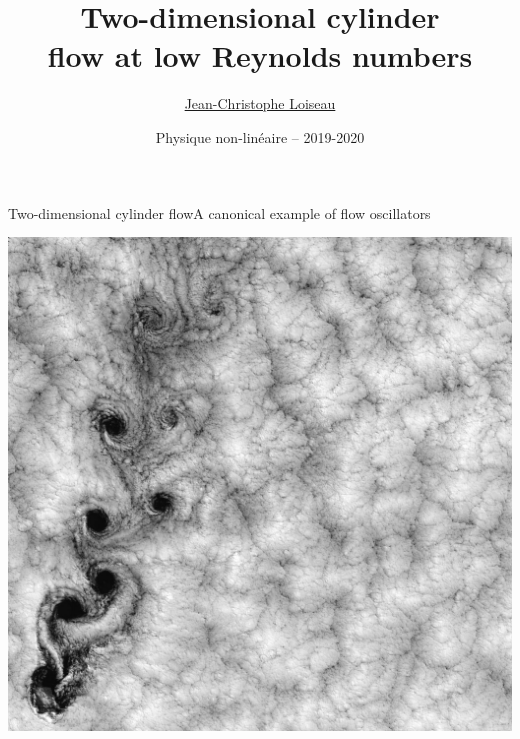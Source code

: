 \documentclass[usenames,dvipsnames,svgnames,10pt,aspectratio=169]{beamer}
\title[Nonlinear physics] %
{
  Two-dimensional cylinder \\
  flow at low Reynolds numbers
}
\author[J.-Ch.~Loiseau] %
{
	\underline{Jean-Christophe Loiseau}
}
\institute[unused]
{
	\url{jean-christophe.loiseau@ensam.eu} \\
	Laboratoire DynFluid \\
	Arts et M\'etiers, France.
}
\date[unused]{Physique non-lin\'eaire -- 2019-2020}
\begin{document}
\titleframe	%


\begin{frame}[t, c]{Two-dimensional cylinder flow}{A canonical example of flow oscillators}
  \begin{minipage}{.48\textwidth}
    \centering
    \includegraphics[width=.75\textwidth]{island}
  \end{minipage}%
  \hfill
  \begin{minipage}{.48\textwidth}
    \centering

\end{minipage}
\end{frame}
\end{document}
